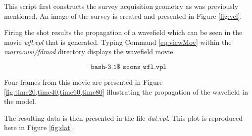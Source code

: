 This script first constructs the survey acquisition geometry as was previously mentioned.  An image of the survey is created and presented
in Figure \ref{fig:vel}.


Firing the shot results the propagation of a wavefield which can be seen in the movie \emph{wfl.vpl} that is generated.  Typing
Command \ref{eq:viewMov} within the \emph{marmousi/fdmod} directory displays the wavefield movie.

\begin{equation}\label{eq:viewMov} \texttt{bash-3.1\$\ scons\ wfl.vpl} \end{equation}

Four frames from this movie are presented in Figure \ref{fig:time20,time40,time60,time80}  illustrating the
propagation of the wavefield in the model.


The resulting data is then presented in the file \emph{dat.vpl}.  This plot is reproduced here in Figure \ref{fig:dat}. 


